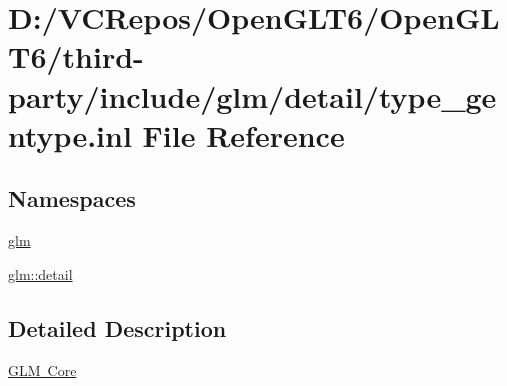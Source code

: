 \hypertarget{type__gentype_8inl}{}\section{D\+:/\+V\+C\+Repos/\+Open\+G\+L\+T6/\+Open\+G\+L\+T6/third-\/party/include/glm/detail/type\+\_\+gentype.inl File Reference}
\label{type__gentype_8inl}
\subsection*{Namespaces}
\begin{DoxyCompactItemize}
\item 
 \mbox{\hyperlink{namespaceglm}{glm}}
\item 
 \mbox{\hyperlink{namespaceglm_1_1detail}{glm\+::detail}}
\end{DoxyCompactItemize}


\subsection{Detailed Description}
\mbox{\hyperlink{group__core}{G\+LM Core}} 